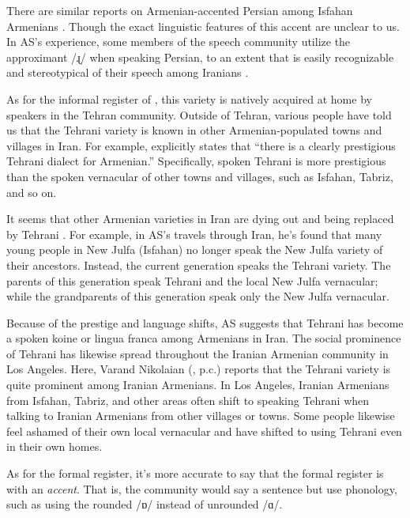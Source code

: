 There are similar reports on Armenian-accented Persian among   Isfahan Armenians \citep{Rezaei-Farnia-2023-ArmenianLanguageIdentityIranCaseIranianArmeniansIsfahan}. Though  the exact linguistic features of this accent are unclear to us.  In AS’s experience, some members of the {\iaIA} speech community utilize the {\iaAbbre} approximant /ɻ/ when speaking Persian, to an extent that is easily recognizable and stereotypical of their speech among Iranians \citep[220]{barry-2018-armenianArmeniansIran}. 


As for the informal register of {\iaIA}, this variety is natively acquired at home by speakers in the Tehran community. Outside of Tehran, various people have told us that the Tehrani variety is known in other Armenian-populated towns and villages in Iran. For example,  \citet[64]{Nercissians-2001-bilingualismDiglossiaEthnicMinorityTehran} explicitly states that ``there is a clearly prestigious Tehrani dialect for Armenian.'' Specifically, spoken Tehrani {\iaIA} is more prestigious than the spoken vernacular of other towns and villages, such as Isfahan, Tabriz, and so on. 

It   seems that other Armenian varieties in Iran are dying out and being replaced by Tehrani {\iaIA}. For example, in AS's travels through Iran, he's found that many young people in New Julfa (Isfahan)  no longer speak the New Julfa variety of their ancestors. Instead, the current generation speaks the Tehrani variety. The parents of this generation speak Tehrani and the local New Julfa vernacular; while the grandparents of this generation speak only the New Julfa vernacular. 

Because of the prestige and language shifts, AS suggests that  Tehrani {\iaIA} has become a spoken koine or lingua franca among Armenians in Iran. The social prominence of Tehrani has likewise spread throughout the Iranian Armenian community in Los Angeles. Here,  Varand Nikolaian (\citeyear{Nikolaian-2016-DialectsArmenianIraniandiasporastudyhierarchicalinteractionIranianArmeniandialects}, p.c.) reports   that the Tehrani variety is quite prominent among Iranian Armenians. In Los Angeles, Iranian Armenians from Isfahan, Tabriz, and other areas often shift to speaking  Tehrani {\iaIA} when talking to   Iranian Armenians from other villages or towns. Some people likewise feel ashamed of their own local vernacular and have shifted to using Tehrani {\iaIA} even in their own homes. 

As for the formal register,   it's more accurate to say that the formal register is {\seaSEA} with an \textit{{\iaIA}  accent}. That is, the community would say a  {\seaSEA} sentence but use {\iaIA} phonology, such as using the rounded {\iaIA} /ɒ/ instead of unrounded {\seaSE} /ɑ/. 


